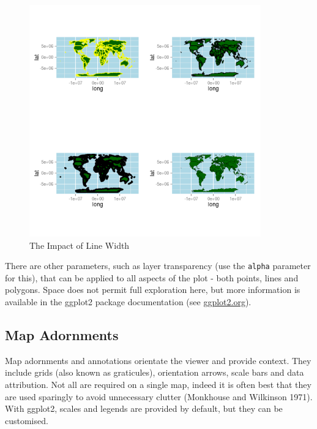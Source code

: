 \documentclass[]{article}
\let\Oldincludegraphics\includegraphics
\renewcommand{\includegraphics}[1]{\Oldincludegraphics[width=10cm]{#1}}
\begin{document}
\begin{figure}[htbp]
\centering
\includegraphics{figure/The_Impact_of_Line_Width.png}
\caption{The Impact of Line Width} \label{flinew}
\end{figure}

There are other parameters, such as layer transparency (use the
\texttt{alpha} parameter for this), that can be applied to all aspects of
the plot - both points, lines and polygons. Space does not permit full
exploration here, but more information is available in the ggplot2
package documentation (see \href{http://ggplot2.org/}{ggplot2.org}).

\subsection{Map Adornments}


Map adornments and annotations orientate the viewer and provide context.
They include grids (also known as graticules), orientation arrows, scale
bars and data attribution. Not all are required on a single map, indeed
it is often best that they are used sparingly to avoid unnecessary
clutter (Monkhouse and Wilkinson 1971). With ggplot2, scales and legends
are provided by default, but they can be customised.
\end{document}
